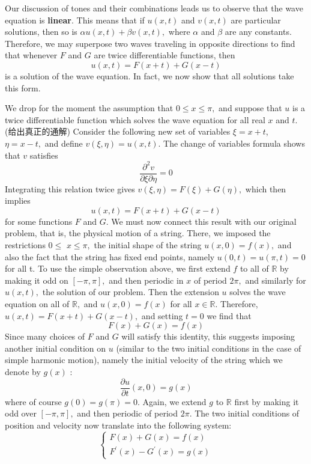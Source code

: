 \documentclass[12pt]{book}
\theoremstyle{definition}\newtheorem{dfn}{Définition}[chapter]
\theoremstyle{plain}\newtheorem{thm}{Théorème}[chapter]
\theoremstyle{plain}\newtheorem{prp}{Proposition}[chapter]
\theoremstyle{plain}\newtheorem{lem}{\bf Lemme}[chapter]
\theoremstyle{plain}\newtheorem{axm}{\bf Axiome}[chapter]
\theoremstyle{plain}\newtheorem{lmm}{\bf Lemme}[chapter]
\theoremstyle{plain}\newtheorem{exm}{\bf Example}[chapter]
\theoremstyle{plain}\newtheorem{cor}{\bf Corollaire}[chapter]
\theoremstyle{remark}\newtheorem{rem}{Remarque}[chapter]
\begin{document}
Our discussion of tones and their combinations leads us to observe that the wave equation is {\bf linear}. This means that if $u(x, t)$ and $v(x, t)$ are particular solutions, then so is $\alpha u(x, t)+\beta v(x, t),$ where $\alpha$ and $\beta$ are any constants. Therefore, we may superpose two waves traveling in opposite directions to find that whenever $F$ and $G$ are twice differentiable functions, then
$$
u(x, t)=F(x+t)+G(x-t)
$$
is a solution of the wave equation. In fact, we now show that all solutions take this form.

We drop for the moment the assumption that $0 \leq x \leq \pi,$ and suppose that $u$ is a twice differentiable function which solves the wave equation
for all real $x$ and $t$.(给出真正的通解) Consider the following new set of variables $\xi=x+t$, $\eta=x-t,$ and define $v(\xi, \eta)=u(x, t) .$ The change of variables formula shows that $v$ satisfies
$$
\frac{\partial^{2} v}{\partial \xi \partial \eta}=0
$$
Integrating this relation twice gives $v(\xi, \eta)=F(\xi)+G(\eta),$ which then implies
$$
u(x, t)=F(x+t)+G(x-t)
$$
for some functions $F$ and $G$.
We must now connect this result with our original problem, that is, the physical motion of a string. There, we imposed the restrictions $0 \leq$ $x \leq \pi,$ the initial shape of the string $u(x, 0)=f(x),$ and also the fact that the string has fixed end points, namely $u(0, t)=u(\pi, t)=0$ for all
t. To use the simple observation above, we first extend $f$ to all of $\mathbb{R}$ by making it odd on $[-\pi, \pi],$ and then periodic in $x$ of period $2 \pi,$ and similarly for $u(x, t),$ the solution of our problem. Then the extension $u$ solves the wave equation on all of $\mathbb{R},$ and $u(x, 0)=f(x)$ for all $x \in \mathbb{R}$. Therefore, $u(x, t)=F(x+t)+G(x-t),$ and setting $t=0$ we find that
$$
F(x)+G(x)=f(x)
$$
Since many choices of $F$ and $G$ will satisfy this identity, this suggests imposing another initial condition on $u$ (similar to the two initial conditions in the case of simple harmonic motion), namely the initial velocity of the string which we denote by $g(x)$ :
$$
\frac{\partial u}{\partial t}(x, 0)=g(x)
$$
where of course $g(0)=g(\pi)=0 .$ Again, we extend $g$ to $\mathbb{R}$ first by making it odd over $[-\pi, \pi],$ and then periodic of period $2 \pi .$ The two initial conditions of position and velocity now translate into the following system:
$$
\left\{\begin{array}{l}
F(x)+G(x)=f(x) \\
F^{\prime}(x)-G^{\prime}(x)=g(x)
\end{array}\right.
$$
\end{document}
